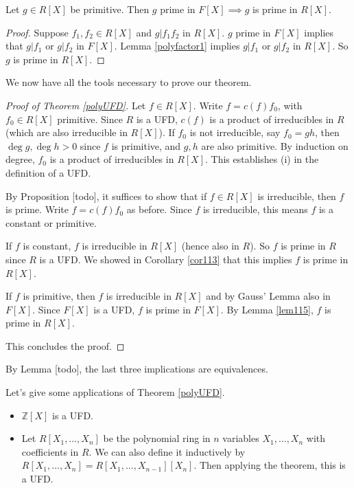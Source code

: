 \documentclass[egregdoesnotlikesansseriftitles,a4paper]{scrartcl}
\begin{document}
\begin{lemma}\label{lem115}
       Let $g \in R[X]$ be primitive. Then $g $ prime in $F[X] \implies g$ is prime in $R[X]$.
       \begin{proof}
              Suppose $f_1 , f_2  \in R[X]$ and $g | f_1 f_2 $ in $R[X]$. $g$ prime in $F[X]$ implies that $g|f_1 $ or $g|f_2 $ in $F[X]$. Lemma \ref{polyfactor1} implies $g|f_1 $ or $g|f_2 $ in $R[X]$. So $g $ is prime in $R[X]$.
       \end{proof}
\end{lemma}
We now have all the tools necessary to prove our theorem.
\begin{proof}[Proof of Theorem \ref{polyUFD}]
       Let $f \in R[X]$. Write $f= c (f) f_0 $, with $f_0 \in R[X]$ primitive. Since $R$ is a UFD, $c (f)$ is a product of irreducibles in $R$ (which are also irreducible in $R[X]$). If $f_0 $ is not irreducible, say $f_0 =gh$, then $\operatorname{deg}g, \operatorname{deg}h >0$ since $f$ is primitive, and $g,h$ are also primitive. By induction on degree, $f_0 $ is a product of irreducibles in $R[X]$. This establishes (i) in the definition of a UFD.

       By Proposition [todo], it suffices to show that if $f \in R[X]$ is irreducible, then $f$ is prime. Write $f= c (f)f_0 $ as before. Since $f$ is irreducible, this means $f$ is a constant or primitive.
       \begin{case}
             If $f$ is constant, $f$ is irreducible in $R[X]$ (hence also in $R$). So $f$ is prime in $R$ since $R$ is a UFD. We showed in Corollary \ref{cor113} that this implies $f$ is prime in $R[X]$.
       \end{case}
       \begin{case}
             If $f$ is primitive, then $f$ is irreducible in $R[X]$ and by Gauss' Lemma also in $F[X]$. Since $F[X]$ is a UFD, $f$ is prime in $F[X]$. By Lemma \ref{lem115}, $f$ is prime in $R[X]$.
       \end{case}
       This concludes the proof.
\end{proof}
\begin{remark}
       By Lemma [todo], the last three implications are equivalences.
\end{remark}
\begin{example*}
       Let's give some applications of Theorem \ref{polyUFD}.
       \begin{itemize}
             \item $\mathbb{Z}[X]$ is a UFD.
             \item Let $R[X_1 , \ldots , X_n]$ be the polynomial ring in $n$ variables $X_1 , \ldots, X_n$ with coefficients in $R$. We can also define it inductively by $R[X_1 , \ldots , X_n]=R[X_1 , \ldots , X_{n-1}][X_n]$. Then applying the theorem, this is a UFD.
       \end{itemize}
\end{example*}
\end{document}
